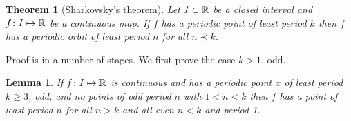 \documentclass{notes}
\theoremstyle{plain}
\newtheorem{theorem}[proposition]{Theorem}
\newtheorem{lemma}[proposition]{Lemma}
\begin{document}
\begin{theorem}[Sharkovsky's theorem]
Let $I \subset \mathbb{R}$ be a closed interval and $f \colon I \mapsto \mathbb{R}$ be
a continuous map.  If $f$ has a periodic point of least period $k$
then $f$ has a periodic orbit of least period $n$ for all $n \prec k$. 
\end{theorem}

Proof is in a number of stages.  We first prove the case $k > 1$, odd.

\begin{lemma}\label{lem:shar1}
If $f \colon I \mapsto \mathbb{R}$ is continuous and has a periodic point $x$
of least period $k \ge 3$, odd, and no points of odd period $n$ with
$1 < n < k$ then $f$ has a point of least period $n$ for all $n > k$
and all even $n < k$ and period 1.
\end{lemma}
\end{document}
